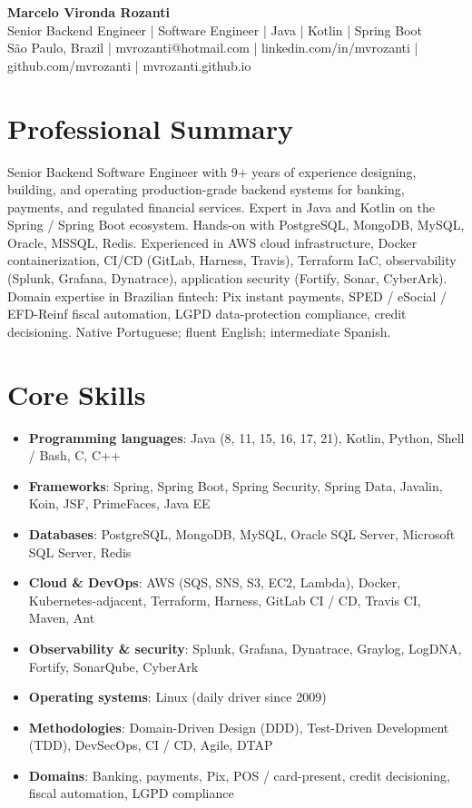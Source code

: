 \documentclass[11pt,a4paper]{article}
\begin{document}
\begin{center}
{\Large\bfseries Marcelo Vironda Rozanti}\\[2pt]
Senior Backend Engineer | Software Engineer | Java | Kotlin | Spring Boot\\[2pt]
São Paulo, Brazil | mvrozanti@hotmail.com | linkedin.com/in/mvrozanti | github.com/mvrozanti | mvrozanti.github.io
\end{center}

\section{Professional Summary}
Senior Backend Software Engineer with 9+ years of experience designing, building, and operating production-grade backend systems for banking, payments, and regulated financial services. Expert in Java and Kotlin on the Spring / Spring Boot ecosystem. Hands-on with PostgreSQL, MongoDB, MySQL, Oracle, MSSQL, Redis. Experienced in AWS cloud infrastructure, Docker containerization, CI/CD (GitLab, Harness, Travis), Terraform IaC, observability (Splunk, Grafana, Dynatrace), application security (Fortify, Sonar, CyberArk). Domain expertise in Brazilian fintech: Pix instant payments, SPED / eSocial / EFD-Reinf fiscal automation, LGPD data-protection compliance, credit decisioning. Native Portuguese; fluent English; intermediate Spanish.

\section{Core Skills}
\begin{itemize}
\item \textbf{Programming languages}: Java (8, 11, 15, 16, 17, 21), Kotlin, Python, Shell / Bash, C, C++
\item \textbf{Frameworks}: Spring, Spring Boot, Spring Security, Spring Data, Javalin, Koin, JSF, PrimeFaces, Java EE
\item \textbf{Databases}: PostgreSQL, MongoDB, MySQL, Oracle SQL Server, Microsoft SQL Server, Redis
\item \textbf{Cloud \& DevOps}: AWS (SQS, SNS, S3, EC2, Lambda), Docker, Kubernetes-adjacent, Terraform, Harness, GitLab CI / CD, Travis CI, Maven, Ant
\item \textbf{Observability \& security}: Splunk, Grafana, Dynatrace, Graylog, LogDNA, Fortify, SonarQube, CyberArk
\item \textbf{Operating systems}: Linux (daily driver since 2009)
\item \textbf{Methodologies}: Domain-Driven Design (DDD), Test-Driven Development (TDD), DevSecOps, CI / CD, Agile, DTAP
\item \textbf{Domains}: Banking, payments, Pix, POS / card-present, credit decisioning, fiscal automation, LGPD compliance
\end{itemize}
\end{document}
